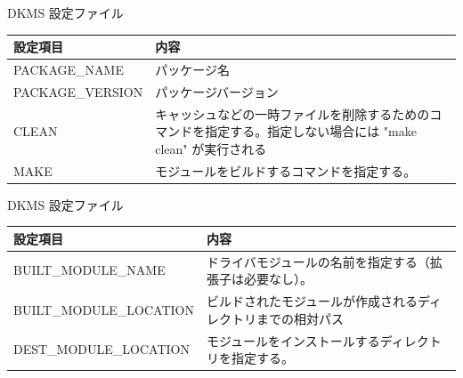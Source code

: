 \begin{frame}{DKMS 設定ファイル}

\begin{center}

  \begin{tabular}{|l|p{}|}
 \hline
 設定項目 & 内容 \\
 \hline \hline
PACKAGE\_NAME & パッケージ名 \\\hline
PACKAGE\_VERSION & パッケージバージョン \\\hline
CLEAN & キャッシュなどの一時ファイルを削除するためのコマンドを指定する。指定しない場合には "make clean" が実行される\\\hline
MAKE & モジュールをビルドするコマンドを指定する。\\
 \hline
 \end{tabular}
\end{center}

\end{frame}

\begin{frame}{DKMS 設定ファイル}

\begin{center}

  \begin{tabular}{|l|p{}|}
 \hline
 設定項目 & 内容 \\
 \hline \hline
BUILT\_MODULE\_NAME & ドライバモジュールの名前を指定する（拡張子は必要なし）。\\\hline
BUILT\_MODULE\_LOCATION &  ビルドされたモジュールが作成されるディレクトリまでの相対パス\\\hline
DEST\_MODULE\_LOCATION & モジュールをインストールするディレクトリを指定する。\\
 \hline
 \end{tabular}
\end{center}

\end{frame}


